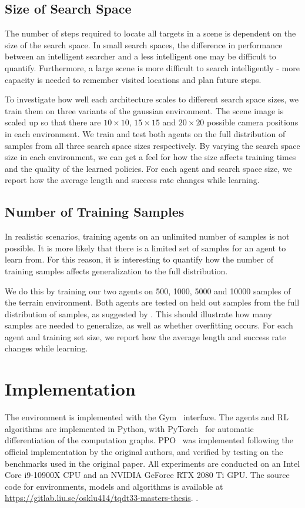 \subsection{Size of Search Space}

The number of steps required to locate all targets in a scene is dependent on the size of the search space.
In small search spaces, the difference in performance between an intelligent searcher and a less intelligent one may be difficult to quantify.
Furthermore, a large scene is more difficult to search intelligently - more capacity is needed to remember visited locations and plan future steps.

To investigate how well each architecture scales to different search space sizes, we train them on three variants of the gaussian environment.
The scene image is scaled up so that there are \(10 \times 10\), \(15 \times 15\) and \(20 \times 20\) possible camera positions in each environment.
We train and test both agents on the full distribution of samples from all three search space sizes respectively.
By varying the search space size in each environment, we can get a feel for how the size affects training times and the quality of the learned policies.
For each agent and search space size, we report how the average length and success rate changes while learning.

\subsection{Number of Training Samples}

In realistic scenarios, training agents on an unlimited number of samples is not possible.
It is more likely that there is a limited set of samples for an agent to learn from.
For this reason, it is interesting to quantify how the number of training samples affects generalization to the full distribution.

We do this by training our two agents on 500, 1000, 5000 and 10000 samples of the terrain environment.
Both agents are tested on held out samples from the full distribution of samples, as suggested by \cite{cobbe_leveraging_2020}.
This should illustrate how many samples are needed to generalize, as well as whether overfitting occurs.
For each agent and training set size, we report how the average length and success rate changes while learning.

\section{Implementation}

The environment is implemented with the Gym~\cite{brockman_openai_2016} interface.
The agents and RL algorithms are implemented in Python, with PyTorch~\cite{paszke_pytorch_2019} for automatic differentiation of the computation graphs.
PPO~\cite{schulman_proximal_2017} was implemented following the official implementation by the original authors,
and verified by testing on the benchmarks used in the original paper.
All experiments are conducted on an Intel Core i9-10900X CPU and an NVIDIA GeForce RTX 2080 Ti GPU.
The source code for environments, models and algorithms is available at \url{https://gitlab.liu.se/osklu414/tqdt33-masters-thesis}.
.
